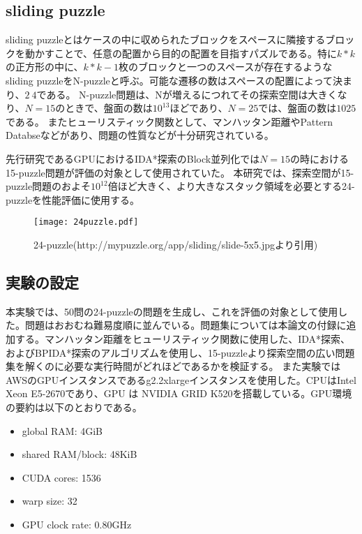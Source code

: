\documentclass[a4paper,11pt,oneside,openany]{jsbook}
\begin{document}
\subsection{sliding puzzle}
sliding puzzleとはケースの中に収められたブロックをスペースに隣接するブロックを動かすことで、任意の配置から目的の配置を目指すパズルである。特に$k * k$の正方形の中に、$ k * k - 1$枚のブロックと一つのスペースが存在するようなsliding puzzleをN-puzzleと呼ぶ。可能な遷移の数はスペースの配置によって決まり、$2~4$である。
N-puzzle問題は、Nが増えるにつれてその探索空間は大きくなり、$N=15$のときで、盤面の数は$10^{13}$ほどであり、$N=25$では、盤面の数は$10{25}$である。
またヒューリスティック関数として、マンハッタン距離やPattern Databseなどがあり、問題の性質などが十分研究されている。

先行研究であるGPUにおけるIDA*探索のBlock並列化\cite{HA17}では$N=15$の時における15-puzzle問題が評価の対象として使用されていた。
本研究では、探索空間が15-puzzle問題のおよそ$10^{12}$倍ほど大きく、より大きなスタック領域を必要とする24-puzzleを性能評価に使用する。
\begin{figure}[htbp]
\begin{center}
\texttt{[image: 24puzzle.pdf]}
\caption{24-puzzle(http://mypuzzle.org/app/sliding/slide-5x5.jpgより引用)}
\end{center}
\end{figure}


\subsection{実験の設定}
本実験では、50問の24-puzzleの問題を生成し、これを評価の対象として使用した。問題はおおむね難易度順に並んでいる。問題集については本論文の付録に追加する。マンハッタン距離をヒューリスティック関数に使用した、IDA*探索、およびBPIDA*探索\cite{HA17}のアルゴリズムを使用し、15-puzzleより探索空間の広い問題集を解くのに必要な実行時間がどれほどであるかを検証する。
また実験ではAWSのGPUインスタンスであるg2.2xlargeインスタンスを使用した。CPUはIntel Xeon E5-2670であり、GPU
は NVIDIA GRID K520を搭載している。GPU環境の要約は以下のとおりである。
\begin{itemize}
 \item global RAM: 4GiB
 \item shared RAM/block: 48KiB
 \item CUDA cores: 1536
 \item warp size: 32
 \item GPU clock rate: 0.80GHz
\end{itemize}
\end{document}
